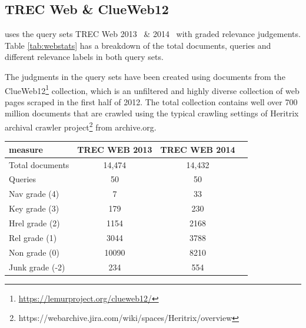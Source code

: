 \subsection{TREC Web \& ClueWeb12 }\label{sec:trecclue}
\datasetname uses the query sets TREC Web 2013~\cite{collins2013trec} \& 2014~\cite{collins2015trec} with graded relevance judgements. Table \ref{tab:webstats} has a breakdown of the total documents, queries and different relevance labels in both query sets. 

The judgments in the query sets have been created using documents from the  ClueWeb12\footnote{\url{https://lemurproject.org/clueweb12/}} collection, which is an unfiltered and highly diverse collection of web pages scraped in the first half of 2012. The total collection contains well over 700 million documents that are crawled using the typical crawling settings of Heritrix archival crawler project\footnote{https://webarchive.jira.com/wiki/spaces/Heritrix/overview} from archive.org.  

\begin{center}
  \begin{tabular}{ l | c | c | c }
    measure & TREC WEB 2013 & TREC WEB 2014 \\
    \hline
    Total documents & 14,474 & 14,432 \\
    Queries & 50 & 50 \\
    Nav grade (4) & 7 & 33 \\
    Key grade (3) & 179 & 230 \\
    Hrel grade (2) & 1154 & 2168 \\
    Rel grade (1) & 3044 & 3788 \\
    Non grade (0) & 10090 & 8210 \\
    Junk grade (-2) & 234 & 554 \\
    \hline
  \end{tabular}
   \label{tab:webstats} 
\end{center}

